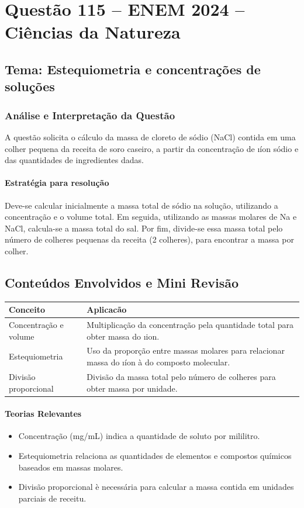 \documentclass{article}
\begin{document}
\section*{Questão 115 -- ENEM 2024 -- Ciências da Natureza}

\subsection*{Tema: Estequiometria e concentrações de soluções}

\subsubsection*{Análise e Interpretação da Questão}
A questão solicita o cálculo da massa de cloreto de sódio (NaCl) contida em uma colher pequena da receita de soro caseiro,
a partir da concentração de \i{íon sódio} e das quantidades de ingredientes dadas.

\paragraph{Estratégia para resolução} Deve-se calcular inicialmente a massa total de sódio na solução,
utilizando a concentração e o volume total. Em seguida, utilizando as massas molares de Na e NaCl,
calcula-se a massa total do sal. Por fim, divide-se essa massa total pelo número de colheres pequenas da receita
(2 colheres), para encontrar a massa por colher.

\subsection*{Conteúdos Envolvidos e Mini Revisão}

\begin{tabular}{|p{5cm}|p{8cm}|}
\hline
\textbf{Conceito} & \textbf{Aplicacão} \\
\hline
Concentração e volume & Multiplicação da concentração pela quantidade total para obter massa do \i{ion}. \\
\hline
Estequiometria & Uso da proporção entre massas molares para relacionar massa do \i{íon} \`a do composto molecular. \\
\hline
Divisão proporcional & Divisão da massa total pelo número de colheres para obter massa por unidade. \\
\hline
\end{tabular}

\paragraph{Teorias Relevantes}
\begin{itemize}
  \item Concentração (mg/mL) indica a quantidade de soluto por mililitro.
  \item Estequiometria relaciona as quantidades de elementos e compostos químicos baseados em massas molares.
  \item Divisão proporcional \`e necessária para calcular a massa contida em unidades parciais de receitu\a.
\end{itemize}
\end{document}

